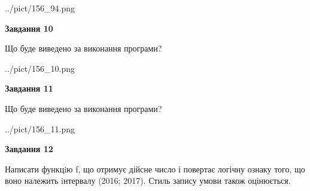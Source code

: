 \documentclass[12pt, ukrainian]{article}
\begin{document}
{\begin {large}
\begin{center}
	{../pict/156_94.png}
\end{center}
\newpage

{\begin {center}\textbf{Завдання 10}\end {center}}

Що буде виведено за виконання програми?\par
\begin{center}
	{../pict/156_10.png}
\end{center}
\newpage

{\begin {center}\textbf{Завдання 11}\end {center}}

Що буде виведено за виконання програми?\par
\begin{center}
	{../pict/156_11.png}
\end{center}
\newpage

{\begin {center}\textbf{Завдання 12}\end {center}}


Написати функцiю f, що отримує дійсне число і повертає логічну ознаку того, що воно належить iнтервалу (2016; 2017). Стиль запису умови також оцінюється.\par
\newpage

\end {large}}
\end{document}
